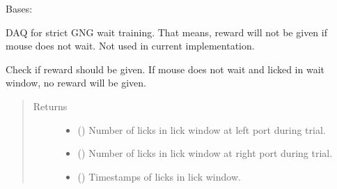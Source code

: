 \documentclass[letterpaper,10pt,english]{sphinxmanual}
\begin{document}
\begin{fulllineitems}
\label{\detokenize{NoSeMazeControl/daqface:daqface.DAQ.DoAiMultiTaskWaitTraining}}
\pysigstartsignatures
{}
\pysigstopsignatures
\sphinxAtStartPar
Bases: 

\sphinxAtStartPar
DAQ for strict GNG wait training. That means, reward will not be given
if mouse does not wait. Not used in current implementation.

\begin{fulllineitems}
\label{\detokenize{NoSeMazeControl/daqface:daqface.DAQ.DoAiMultiTaskWaitTraining.CheckLicks}}
\pysigstartsignatures
{}
\pysigstopsignatures
\sphinxAtStartPar
Check if reward should be given. If mouse does not wait and licked in
wait window, no reward will be given.
\begin{quote}\begin{description}
\item[{Returns}] \leavevmode
\sphinxAtStartPar
\begin{itemize}
\item {} 
\sphinxAtStartPar
{} () \textendash{} Number of licks in lick window at left port during trial.

\item {} 
\sphinxAtStartPar
{} () \textendash{} Number of licks in lick window at right port during trial.

\item {} 
\sphinxAtStartPar
{} () \textendash{} Timestamps of licks in lick window.


\end{itemize}
\end{description}
\end{quote}
\end{fulllineitems}
\end{fulllineitems}
\end{document}
